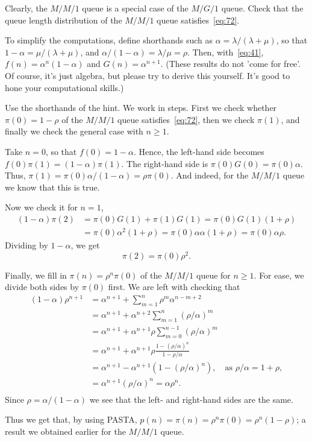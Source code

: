 \begin{exercise}
 Clearly, the $M/M/1$ queue is a special case of the $M/G/1$ queue.
 Check that the queue length distribution of the $M/M/1$ queue satisfies~\cref{eq:72}.
\begin{hint}
 To simplify the computations, define shorthands such as $\alpha=\lambda/(\lambda+\mu)$, so that $1-\alpha = \mu/(\lambda+\mu)$, and $\alpha/(1-\alpha) = \lambda /\mu = \rho$.
 Then, with~\cref{eq:41}, $f(n) = \alpha^n(1-\alpha)$ and $G(n) = \alpha^{n+1}$.
 (These results do not 'come for free'.
 Of course, it's just algebra, but please try to derive this yourself.
 It's good to hone your computational skills.)
\end{hint}
\begin{solution}
Use the shorthands of the hint. We work in steps. First we check whether $\pi(0)=1-\rho$ of the $M/M/1$ queue satisfies~\cref{eq:72}, then we check $\pi(1)$, and finally we check the general case with $n\geq 1$. 

Take $n=0$, so that $f(0)=1-\alpha$. Hence, the left-hand side becomes $f(0) \pi(1) = (1-\alpha)\pi(1)$. The right-hand side is
 $\pi(0)G(0) = \pi(0)\alpha$. Thus,
 $\pi(1) = \pi(0)\alpha/(1-\alpha) = \rho \pi(0)$. And indeed, for the $M/M/1$ queue we know that this is true. 

Now we check it for $n=1$,
\begin{equation*}
 \begin{split}
 (1-\alpha) \pi(2) 
&= \pi(0)G(1) + \pi(1)G(1) = \pi(0)G(1)(1+\rho) \\
&= \pi(0)\alpha^2(1+\rho) = \pi(0)\alpha \alpha (1+\rho) = \pi(0)\alpha \rho.
 \end{split}
\end{equation*}
Dividing by $1-\alpha$, we get
\begin{equation*}
 \pi(2) = \pi(0)\rho^2.
\end{equation*}

Finally, we fill in $\pi(n) = \rho^n \pi(0)$ of the $M/M/1$ queue for $n\geq 1$.
For ease, we divide both sides by $\pi(0)$ first.
We are left with checking that
\begin{align*}
 (1-\alpha)\rho^{n+1} 
&= \alpha^{n+1} + \sum_{m=1}^n \rho^m \alpha^{n-m+2} \\
&= \alpha^{n+1} + \alpha^{n+2}\sum_{m=1}^n (\rho/\alpha)^m \\
&= \alpha^{n+1} + \alpha^{n+1}\rho \sum_{m=0}^{n-1} (\rho/\alpha)^m \\
&= \alpha^{n+1} + \alpha^{n+1}\rho \frac{1-(\rho/\alpha)^n}{1-\rho/\alpha}\\
&= \alpha^{n+1} - \alpha^{n+1}(1-(\rho/\alpha)^n), \quad\text{as } \rho/\alpha = 1+\rho,\\
&= \alpha^{n+1}(\rho/\alpha)^n = \alpha \rho^n.\\
\end{align*}
Since $\rho=\alpha/(1-\alpha)$ we see that the left- and right-hand sides are the same. 

Thus we get that, by using PASTA, $p(n) = \pi(n) = \rho^n \pi(0) = \rho^n (1-\rho)$; a result we
obtained earlier for the $M/M/1$ queue.
\end{solution}
\end{exercise}

